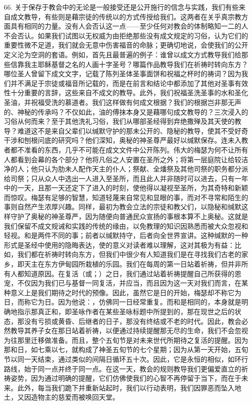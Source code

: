 66. 关于保存于教会中的无论是一般接受还是公开施行的信念与实践，我们有些来自成文教导，有些则是藉宗徒的传统以的方式传授给我们。这两者在关乎真宗教方面具有相同的力量。没有人会否认这一点——至少任何对教会的体制略知一二的人不会否认。如果我们试图以无权威为由拒绝那些没有成文规定的习俗，认为它们的重要性微不足道，我们就会无意中伤害福音的命脉；更确切地说，会使我们的公开定义沦为空洞的套语。例如，首先且最普遍的例子：谁曾以成文方式教导我们给那些信靠我主耶稣基督之名的人画十字圣号？哪篇作品教导我们在祈祷时转向东方？哪位圣人曾留下成文文字，记载了陈列圣体圣事面饼和祝福之杯时的祷词？因为我们并不满足于宗徒或福音所记载的，而是在前言和结论中都添加了其他对圣事有效性十分重要的言辞，这些来自不成文的教导。此外，我们祝福圣洗圣事的水和圣化圣油，并祝福受洗的慕道者。我们这样做有何成文根据？我们的根据岂非那无声的、神秘的传承吗？不仅如此，油的傅抹本身又是藉哪句成文教导的？三次浸入的习俗从何而来？至于其他洗礼习俗，我们从哪部圣经得到弃绝撒殚及其天使的教导？难道这不是来自父辈们以缄默守护的那未公开的、隐秘的教导，使其不受好奇干涉和刨根问底的研究吗？他们深知，奥秘的神圣尊严最好以缄默保存。连未入教者都不准看的东西，几乎不可能在成文文件中公开陈列。伟大的梅瑟为何不让所有人都看到会幕的各个部分？他将凡俗之人安置在圣所之外；将第一层庭院让给较洁净的人；他只认为肋未人配作天主的仆人；祭献、全燔祭及其他司祭的职务都分派给司祭；只从众人中选出一人进入至圣所，而且此人并非随时可以进去，只有一年中的一天，且那一天还定下了进入的时刻，使他得以凝视至圣所，为其奇特和新颖而惊叹。梅瑟有足够的智慧，知道轻蔑来自常见和显眼的事，而对不寻常和陌生的事则自然产生浓厚兴趣。同样，最初为教会立法的宗徒和教父们，以隐秘和缄默这样守护了奥秘的神圣尊严，因为随便向普通民众宣扬的事根本算不上奥秘。这就是我们保留不成文规诫和实践的传统的缘由，以免教理的知识因熟悉而被大众忽视和轻视。和是两件不同的事；前者以缄默持守，后者向全世界宣讲。这种缄默的一种形式是圣经中使用的隐晦表达，使的意义对读者难以理解，这对其极为有益：比如，我们都在祈祷时转向东方，但我们中很少有人知道我们是在寻找我们古老的家乡，即天主在东方伊甸园所栽植的乐园。我们在每周的第一日站着祈祷，但并非所有人都知道原因。在复活（或；）之日，我们通过站着祈祷提醒自己所获得的恩宠，不仅因为我们已与基督一同复活，并应当，而且因为这一天对我们而言，在某种意义上是我们期待之时代的预像。因此，虽然它是日的开始，梅瑟却不称它为日，而称它为日。因为他说：，仿佛同一日经常重复。而和是相同的，本身就是明确地指示那真正和，即圣咏作者在某些圣咏标题中所提到的，那在现世之后的状态，那没有亏损或黄昏、后继者的日子，那没有终结或不老的时代。因此，教会必然教导其养子女在那日站着祈祷，以便通过持续提醒那无尽的生命，我们不会忽视为往那里迁移做准备。而且，整个五旬节是对未来世代所期待之复活的提醒。因为那和日，如七乘以七，就构成了神圣五旬节的七个星期；因为从第一天开始，五旬节以同一天结束，通过类似的间隔日循环五十次。因此，它是永恒的相似，如环行路线，始于同一点并终于同一点。在这一天，教会的规则教导我们更偏爱直立的祈祷姿势，因为通过明确的提醒，它们仿佛使我们的心智不再停留于当下，而在于未来。此外，每当我们跪下并重新站起时，我们以行动表明，我们因罪恶而坠入地土，又因造物主的慈爱而被唤回天堂。\par

